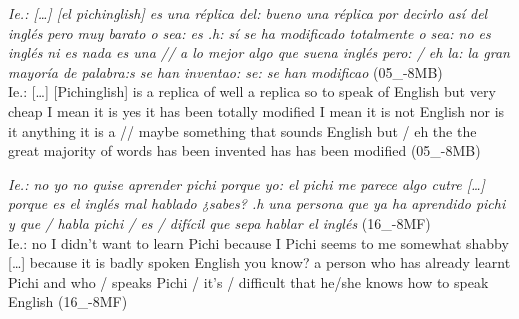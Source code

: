 \documentclass[output=paper]{langscibook}
\begin{document}
\begin{exe}\ex\label{schlumpf:ex5}
	\textit{Ie.: […] [el pichinglish] es una réplica del: bueno una réplica por decirlo así del inglés pero muy barato o sea: es .h: sí se ha modificado totalmente o sea: no es inglés ni es nada es una // a lo mejor algo que suena inglés pero: / eh la: la gran mayoría de palabra:s se han inventao: se: se han modificao} (05\_-8MB)\\
Ie.: […] [Pichinglish] is a replica of well a replica so to speak of English but very cheap I mean it is yes it has been totally modified I mean it is not English nor is it anything it is a // maybe something that sounds English but / eh the the great majority of words has been invented has has been modified (05\_-8MB)

\ex\label{schlumpf:ex6}
	\textit{Ie.: no yo no quise aprender pichi porque yo: el pichi me parece algo cutre […] porque es el inglés mal hablado ¿sabes? .h una persona que ya ha aprendido pichi y que / habla pichi / es / difícil que sepa hablar el inglés} (16\_-8MF)\\
Ie.: no I didn’t want to learn Pichi because I Pichi seems to me somewhat shabby […] because it is badly spoken English you know? a person who has already learnt Pichi and who / speaks Pichi / it’s / difficult that he/she knows how to speak English (16\_-8MF)
\end{exe}
\end{document}
